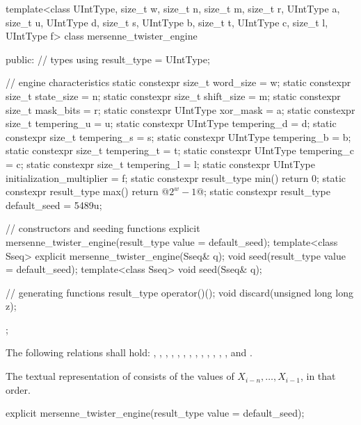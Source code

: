 %
\begin{codeblock}
template<class UIntType, size_t w, size_t n, size_t m, size_t r,
         UIntType a, size_t u, UIntType d, size_t s,
         UIntType b, size_t t,
         UIntType c, size_t l, UIntType f>
  class mersenne_twister_engine {
  public:
    // types
    using result_type = UIntType;

    // engine characteristics
    static constexpr size_t word_size = w;
    static constexpr size_t state_size = n;
    static constexpr size_t shift_size = m;
    static constexpr size_t mask_bits = r;
    static constexpr UIntType xor_mask = a;
    static constexpr size_t tempering_u = u;
    static constexpr UIntType tempering_d = d;
    static constexpr size_t tempering_s = s;
    static constexpr UIntType tempering_b = b;
    static constexpr size_t tempering_t = t;
    static constexpr UIntType tempering_c = c;
    static constexpr size_t tempering_l = l;
    static constexpr UIntType initialization_multiplier = f;
    static constexpr result_type min() { return 0; }
    static constexpr result_type max() { return  @$2^w - 1$@; }
    static constexpr result_type default_seed = 5489u;

    // constructors and seeding functions
    explicit mersenne_twister_engine(result_type value = default_seed);
    template<class Sseq> explicit mersenne_twister_engine(Sseq& q);
    void seed(result_type value = default_seed);
    template<class Sseq> void seed(Sseq& q);

    // generating functions
    result_type operator()();
    void discard(unsigned long long z);
  };
\end{codeblock}

\pnum
The following relations shall hold:
  ,
  ,
  ,
  ,
  ,
  ,
  ,
  ,
  ,
  ,
  ,
  ,
  ,
and
  .

\pnum
The textual representation%
of 
consists of the values of $X_{i - n}, \dotsc, X_{i - 1}$,
in that order.

%
\begin{itemdecl}
explicit mersenne_twister_engine(result_type value = default_seed);
\end{itemdecl}

